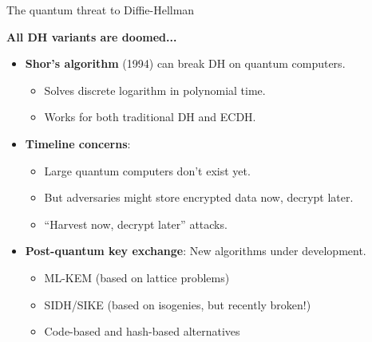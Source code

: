 \documentclass[aspectratio=169, lualatex, handout]{beamer}
\begin{document}
\begin{frame}{The quantum threat to Diffie-Hellman}
	\begin{center}
		\Large\textbf{All DH variants are doomed...}
	\end{center}
	\vspace{0.1cm}
	\begin{itemize}[<+->]
		\item \textbf{Shor's algorithm} (1994) can break DH on quantum computers.
		      \begin{itemize}
			      \item Solves discrete logarithm in polynomial time.
			      \item Works for both traditional DH and ECDH.
		      \end{itemize}
		\item \textbf{Timeline concerns}:
		      \begin{itemize}
			      \item Large quantum computers don't exist yet.
			      \item But adversaries might store encrypted data now, decrypt later.
			      \item ``Harvest now, decrypt later'' attacks.
		      \end{itemize}
		\item \textbf{Post-quantum key exchange}: New algorithms under development.
		      \begin{itemize}
			      \item ML-KEM (based on lattice problems)
			      \item SIDH/SIKE (based on isogenies, but recently broken!)
			      \item Code-based and hash-based alternatives
		      \end{itemize}
	\end{itemize}
\end{frame}
\end{document}

